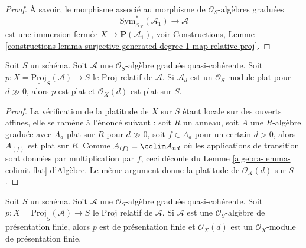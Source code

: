 \begin{proof}
À savoir, le morphisme associé au morphisme de  $\mathcal{O}_S$-algèbres graduées
$$
\text{Sym}_{\mathcal{O}_X}^*(\mathcal{A}_1)
\longrightarrow
\mathcal{A}
$$
est une immersion fermée  $X \to \mathbf{P}(\mathcal{A}_1)$, voir Constructions, Lemme  \ref{constructions-lemma-surjective-generated-degree-1-map-relative-proj}.
\end{proof}

\begin{lemma}
\label{lemma-relative-proj-flat}
Soit  $S$  un schéma. Soit  $\mathcal{A}$  une  $\mathcal{O}_S$-algèbre graduée
quasi-cohérente. Soit  $p : X = \underline{\text{Proj}}_S(\mathcal{A}) \to S$  le Proj relatif de  $\mathcal{A}$. Si
 $\mathcal{A}_d$  est un  $\mathcal{O}_S$-module plat pour  $d \gg 0$, alors  $p$ 
est plat et  $\mathcal{O}_X(d)$  est plat sur  $S$.
\end{lemma}

\begin{proof}
La vérification de la platitude de  $X$  sur  $S$  étant locale sur des ouverts affines, elle se ramène à
l'énoncé suivant : soit  $R$  un anneau, soit  $A$  une
 $R$-algèbre graduée avec  $A_d$  plat sur  $R$  pour
 $d \gg 0$, soit  $f \in A_d$  pour un certain  $d > 0$, alors  $A_{(f)}$ 
est plat sur  $R$. Comme  $A_{(f)} = \colim A_{nd}$  où les applications de transition sont
données par multiplication par  $f$, ceci découle du Lemme  \ref{algebra-lemma-colimit-flat}
d'Algèbre. Le même argument donne la platitude de
 $\mathcal{O}_X(d)$  sur  $S$.
\end{proof}

\begin{lemma}
\label{lemma-relative-proj-finite-presentation}
Soit  $S$  un schéma. Soit  $\mathcal{A}$  une  $\mathcal{O}_S$-algèbre graduée
quasi-cohérente. Soit  $p : X = \underline{\text{Proj}}_S(\mathcal{A}) \to S$  le Proj relatif de  $\mathcal{A}$. Si
 $\mathcal{A}$  est une  $\mathcal{O}_S$-algèbre de présentation finie, alors
 $p$  est de présentation finie et  $\mathcal{O}_X(d)$  est un  $\mathcal{O}_X$-module
de présentation finie.
\end{lemma}

